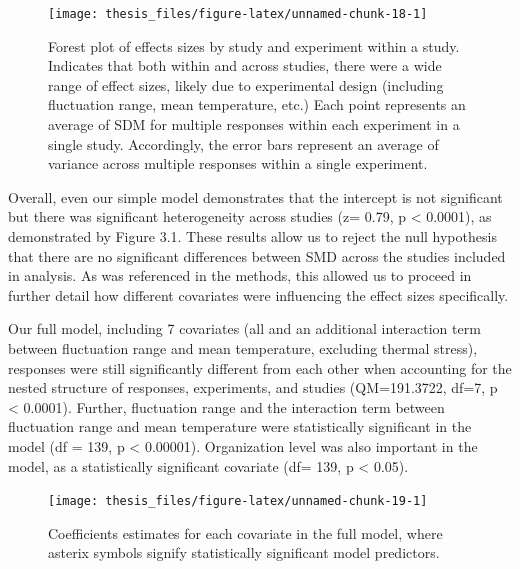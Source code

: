 \documentclass[12pt,twoside]{reedthesis}
\begin{document}
\begin{figure}

{\centering \texttt{[image: thesis\_files/figure-latex/unnamed-chunk-18-1]} 

}

\caption[Forest plot of effect sizes]{Forest plot of effects sizes by study and experiment within a study. Indicates that both within and across studies, there were a wide range of effect sizes, likely due to experimental design (including fluctuation range, mean temperature, etc.) Each point represents an average of SDM for multiple responses within each experiment in a single study. Accordingly, the error bars represent an average of variance across multiple responses within a single experiment.}\label{fig:unnamed-chunk-18}
\end{figure}
Overall, even our simple model demonstrates that the intercept is not significant but there was significant heterogeneity across studies (z= 0.79, p \textless{} 0.0001), as demonstrated by Figure 3.1. These results allow us to reject the null hypothesis that there are no significant differences between SMD across the studies included in analysis. As was referenced in the methods, this allowed us to proceed in further detail how different covariates were influencing the effect sizes specifically.

Our full model, including 7 covariates (all and an additional interaction term between fluctuation range and mean temperature, excluding thermal stress), responses were still significantly different from each other when accounting for the nested structure of responses, experiments, and studies (QM=191.3722, df=7, p \textless{} 0.0001). Further, fluctuation range and the interaction term between fluctuation range and mean temperature were statistically significant in the model (df = 139, p \textless{} 0.00001). Organization level was also important in the model, as a statistically significant covariate (df= 139, p \textless{} 0.05).
\begin{figure}

{\centering \texttt{[image: thesis\_files/figure-latex/unnamed-chunk-19-1]} 

}

\caption[Coefficient estimates for full model]{Coefficients estimates for each covariate in the full model, where asterix symbols signify statistically significant model predictors.}\label{fig:unnamed-chunk-19}
\end{figure}
\clearpage
\end{document}
